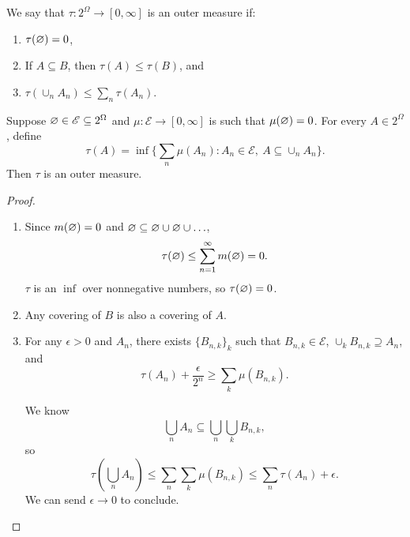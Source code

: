 \begin{definition}
	We say that $\tau: 2^{\Omega} \to [0,\infty]$ is an outer measure if:
	\begin{enumerate}[label=(\roman*)]
		\item $\tau(\varnothing) = 0$,
		\item If $A \subseteq B$, then $\tau(A) \le \tau(B)$, and
		\item $\tau\left( \cup_n A_n \right) \le \sum_n \tau(A_n)$.
	\end{enumerate}
\end{definition}

\begin{theorem} 
	Suppose $\varnothing \in \mathscr{E} \subseteq 2^{\Omega}$ and $\mu: \mathscr{E}\to [0,\infty]$ is such that $\mu(\varnothing) = 0$. For every $A \in 2^{\Omega}$, define \[
		\tau(A) = \inf \{\sum_n \mu(A_n) : A_n \in \mathscr{E},\ A \subseteq \cup_n A_n\}
	.\] 
	Then $\tau$ is an outer measure.
\end{theorem}

\begin{proof}
	\begin{enumerate}[label=(\roman*)]
		\item Since $m(\varnothing) = 0$ and $\varnothing \subseteq \varnothing \cup \varnothing \cup \ldots$, \[
			\tau(\varnothing) \le \sum\limits_{n=1}^{\infty}  m(\varnothing) = 0
			.\] $\tau$ is an $\inf$ over nonnegative numbers, so $\tau(\varnothing) = 0$.
		\item Any covering of $B$ is also a covering of $A$. 
			\item For any $\epsilon > 0$ and $A_n$, there exists $\{B_{n,k}\}_{k}$ such that $B_{n,k} \in \mathscr{E}$, $\cup_k B_{n,k} \supseteq A_n$, and
			\[
				\tau(A_n) + \frac{\epsilon}{2^{n}} \ge \sum_k \mu(B_{n,k}).
			\]

		We know \[
			\bigcup\limits_{n}^{} A_n \subseteq \bigcup\limits_{n}^{} \bigcup\limits_{k}^{} B_{n,k}
		,\] so \[
			\tau\left( \bigcup\limits_{n}^{} A_n \right) \le \sum\limits_{n}^{} \sum\limits_{k}^{} \mu(B_{n,k}) \le \sum\limits_{n}^{} \tau(A_n) + \epsilon 
		.\] We can send $\epsilon \to 0$ to conclude.
	\end{enumerate}

\end{proof}

